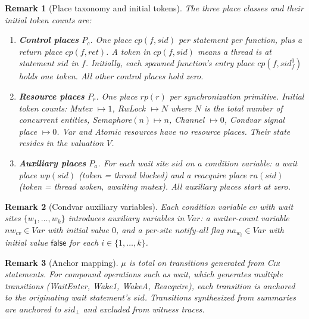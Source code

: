 \documentclass{article}
\newtheorem{remark}{Remark}
\begin{document}
\begin{remark}[Place taxonomy and initial tokens]
\label{rem:places}
The three place classes and their initial token counts are:
\begin{enumerate}
  \item \textbf{Control places} $P_c$.  One place
    $\mathit{cp}(f,\mathit{sid})$ per statement per function, plus a
    return place $\mathit{cp}(f,\mathit{ret})$.  A token in
    $\mathit{cp}(f,\mathit{sid})$ means a thread is at statement
    $\mathit{sid}$ in $f$.  Initially, each spawned function's entry
    place $\mathit{cp}(f,\mathit{sid}^{0}_{f})$ holds one token.
    All other control places hold zero.

  \item \textbf{Resource places} $P_r$.  One place $\mathit{rp}(r)$
    per synchronization primitive.  Initial token counts:
    Mutex $\mapsto 1$,
    RwLock $\mapsto N$ where $N$ is the total number of concurrent
    entities,
    Semaphore$(n)\mapsto n$,
    Channel $\mapsto 0$,
    Condvar signal place $\mapsto 0$.
    \textsf{Var} and \textsf{Atomic} resources have no resource
    places.  Their state resides in the valuation $V$.

  \item \textbf{Auxiliary places} $P_a$.  For each \textsf{wait}
    site $\mathit{sid}$ on a condition variable: a \emph{wait place}
    $\mathit{wp}(\mathit{sid})$ (token = thread blocked) and a
    \emph{reacquire place} $\mathit{ra}(\mathit{sid})$ (token =
    thread woken, awaiting mutex).  All auxiliary places start at
    zero.
\end{enumerate}
\end{remark}

\begin{remark}[Condvar auxiliary variables]
\label{rem:condvar-vars}
Each condition variable $\mathit{cv}$ with wait sites
$\{w_1,\dots,w_k\}$ introduces auxiliary variables in $\mathit{Var}$:
a waiter-count variable $nw_{\mathit{cv}}\in\mathit{Var}$ with initial
value $0$, and a per-site notify-all flag
$na_{w_i}\in\mathit{Var}$ with initial value $\mathsf{false}$ for each
$i\in\{1,\dots,k\}$.
\end{remark}

\begin{remark}[Anchor mapping]
\label{rem:anchor}
$\mu$ is total on transitions generated from \textsc{Cir} statements.
For compound operations such as \textsf{wait}, which generates
multiple transitions (WaitEnter, Wake1, WakeA, Reacquire), each
transition is anchored to the originating \textsf{wait} statement's
$\mathit{sid}$.  Transitions synthesized from summaries are anchored
to $\mathit{sid}_{\bot}$ and excluded from witness traces.
\end{remark}
\end{document}
